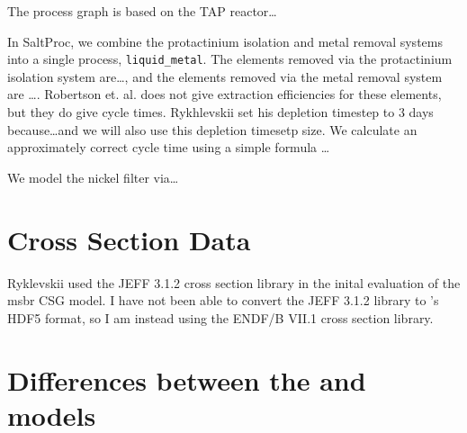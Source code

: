 The process graph is based on the TAP reactor\ldots

In SaltProc, we combine the protactinium isolation and metal removal systems into a single process, \verb.liquid_metal.. The elements removed via the protactinium isolation system are\ldots, and the elements removed via the metal removal system are \ldots. Robertson et. al. does not give extraction efficiencies for these elements, but they do give cycle times. Rykhlevskii set his depletion timestep to 3 days because\ldots and we will also use this depletion
timesetp size. We calculate an approximately correct cycle time using a simple formula \ldots

We model the nickel filter via\ldots



\section{Cross Section Data}
Ryklevskii used the JEFF 3.1.2 cross section library in the inital evaluation of the \Gls{msbr} CSG model. I have not been able to convert the JEFF 3.1.2 library to \OpenMC's HDF5 format, so I am instead using the ENDF/B VII.1 cross section library.

\section{Differences between the \OpenMC and \SerpentTWO models}
